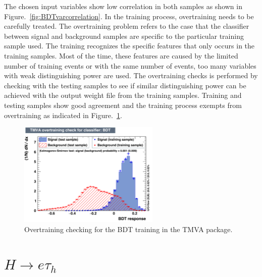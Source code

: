 The chosen input variables show low correlation in both samples as shown in Figure.~\ref{fig:BDTvarcorrelation}. In the training process, overtraining needs to be carefully treated. The overtraining problem refers to the case that the classifier between signal and background samples are specific to the particular training sample used. The training recognizes the specific features that only occurs in the training samples. Most of the time, these features are caused by the limited number of training events or with the same number of events, too many variables with weak distinguishing power are used. The overtraining checks is performed by checking with the testing samples to see if similar distinguishing power can be achieved with the output weight file from the training samples. Training and testing samples show good agreement and the training process exempts from overtraining as indicated in Figure.~\ref{fig:BDTovertraining}.
\begin{figure}[htbp] 
\centering
\includegraphics[width=0.6\textwidth]{chapter5/overtrain_BDT.pdf}
\caption{Overtraining checking for the BDT training in the TMVA package.}
\label{fig:BDTovertraining}
\end{figure}

\section{\texorpdfstring{$H\rightarrow e \tau_h$}{Lg}}

